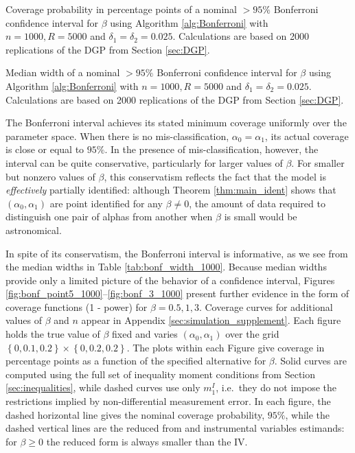 \begin{table}[htbp]
  \centering
  \small
  
  \caption{Coverage probability in percentage points of a nominal $>95\%$ Bonferroni confidence interval for $\beta$ using Algorithm \ref{alg:Bonferroni} with $n = 1000, R = 5000$ and $\delta_1 = \delta_2 = 0.025$. Calculations are based on 2000 replications of the DGP from Section \ref{sec:DGP}.}
  \label{tab:bonf_cover_1000}
\end{table}

\begin{table}
  \small
  \centering
  
  \caption{Median width of a nominal $>95\%$ Bonferroni confidence interval for $\beta$ using Algorithm \ref{alg:Bonferroni} with $n = 1000, R = 5000$ and $\delta_1 = \delta_2 = 0.025$. Calculations are based on 2000 replications of the DGP from Section \ref{sec:DGP}.}
  \label{tab:bonf_width_1000}
\end{table}

The Bonferroni interval achieves its stated minimum coverage uniformly over the parameter space.
When there is no mis-classification, $\alpha_0 = \alpha_1$, its actual coverage is close or equal to $95\%$.
In the presence of mis-classification, however, the interval can be quite conservative, particularly for larger values of $\beta$.
For smaller but nonzero values of $\beta$, this conservatism reflects the fact that the model is \emph{effectively} partially identified: although Theorem \ref{thm:main_ident} shows that $(\alpha_0, \alpha_1)$ are point identified for any $\beta\neq 0$, the amount of data required to distinguish one pair of alphas from another when $\beta$ is small would be astronomical.

In spite of its conservatism, the Bonferroni interval is informative, as we see from the median widths in Table \ref{tab:bonf_width_1000}. 
Because median widths provide only a limited picture of the behavior of a confidence interval, Figures \ref{fig:bonf_point5_1000}--\ref{fig:bonf_3_1000} present further evidence in the form of coverage functions (1 - power) for $\beta = 0.5, 1, 3$.
Coverage curves for additional values of $\beta$ and $n$ appear in Appendix \ref{sec:simulation_supplement}. 
Each figure holds the true value of $\beta$ fixed and varies $(\alpha_0, \alpha_1)$ over the grid $\left\{ 0, 0.1, 0.2 \right\}\times \left\{ 0, 0.2, 0.2 \right\}$. 
The plots within each Figure give coverage in percentage points as a function of the specified alternative for $\beta$.
Solid curves are computed using the full set of inequality moment conditions from  Section \ref{sec:inequalities}, while dashed curves use only $m_{1}^I$, i.e.\ they do not impose the restrictions implied by non-differential measurement error.
In each figure, the dashed horizontal line gives the nominal coverage probability, $95\%$, while the dashed vertical lines are the reduced from  and instrumental variables estimands: for $\beta \geq 0$ the reduced form is always smaller than the IV.


